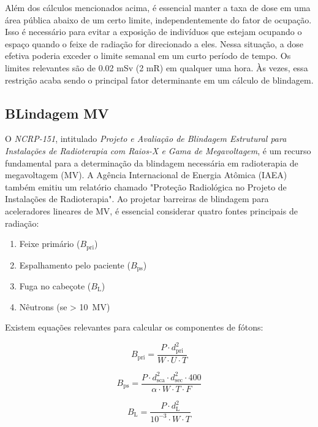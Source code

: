 \documentclass[11pt,a4paper]{article}
\begin{document}
	Além dos cálculos mencionados acima, é essencial manter a taxa de dose em uma área pública abaixo de um certo limite, independentemente do fator de ocupação. Isso é necessário para evitar a exposição de indivíduos que estejam ocupando o espaço quando o feixe de radiação for direcionado a eles. Nessa situação, a dose efetiva poderia exceder o limite semanal em um curto período de tempo. Os limites relevantes são de 0.02 mSv (2 mR) em qualquer uma hora. Às vezes, essa restrição acaba sendo o principal fator determinante em um cálculo de blindagem.

\subsection*{BLindagem MV}


	O \textit{NCRP-151}, intitulado \textit{Projeto e Avaliação de Blindagem Estrutural para Instalações de Radioterapia com Raios-X e Gama de Megavoltagem}, é um recurso fundamental para a determinação da blindagem necessária em radioterapia de megavoltagem (MV). A Agência Internacional de Energia Atômica (IAEA) também emitiu um relatório chamado "Proteção Radiológica no Projeto de Instalações de Radioterapia". Ao projetar barreiras de blindagem para aceleradores lineares de MV, é essencial considerar quatro fontes principais de radiação:

		\begin{enumerate}
		\item Feixe primário ($B_{\text{pri}}$)
		\item Espalhamento pelo paciente ($B_{\text{ps}}$)
		\item Fuga no cabeçote ($B_{\text{L}}$)
		\item Nêutrons (se > \SI{10}{\mega\volt})
		\end{enumerate}

	Existem equações relevantes para calcular os componentes de fótons:

		\begin{equation}
		B_{\text{pri}} = \frac{P \cdot d_{\text{pri}}^2}{{W \cdot U \cdot T}}
		\end{equation}

		\begin{equation}
		B_{\text{ps}} = \frac{{P \cdot d_{\text{sca}}^2 \cdot d_{\text{sec}}^2 \cdot 400}}{{\alpha \cdot W \cdot T \cdot F}}
		\end{equation}

		\begin{equation}
		B_{\text{L}} = \frac{{P \cdot d_{\text{L}}^2}}{{10^{-3} \cdot W \cdot T}}
		\end{equation}
\end{document}
